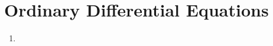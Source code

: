 \chapter{Ordinary Differential Equations}
\begin{enumerate}[label=Week \arabic*]
	\item 
\end{enumerate}

